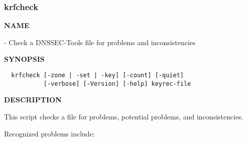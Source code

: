 \clearpage

\subsubsection{krfcheck}

{\bf NAME}

 - Check a DNSSEC-Tools  file for problems and
inconsistencies

{\bf SYNOPSIS}

\begin{verbatim}
  krfcheck [-zone | -set | -key] [-count] [-quiet]
           [-verbose] [-Version] [-help] keyrec-file
\end{verbatim}

{\bf DESCRIPTION}

This script checks a  file for problems, potential problems,
and inconsistencies.

Recognized problems include:


